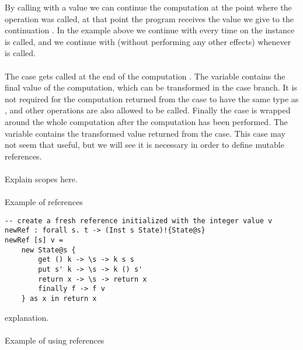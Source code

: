 By calling  with a value we can continue the computation at the point where the operation was called, at that point the program receives the value we give to the continuation .
In the example above we continue with  every time  on the instance  is called, and we continue with \ident{()} (without performing any other effects) whenever  is called.
\\\\
The  case gets called at the end of the computation .
The variable  contains the final value of the computation, which can be transformed in the case branch.
It is not required for the computation returned from the case to have the same type as , and other operations are also allowed to be called.
Finally the  case is wrapped around the whole computation  after the  computation has been performed.
The variable  contains the transformed value returned from the  case.
This case may not seem that useful, but we will see it is necessary in order to define mutable references.
\\\\
Explain scopes here.
\\\\
Example of references

\begin{verbatim}
-- create a fresh reference initialized with the integer value v
newRef : forall s. t -> (Inst s State)!{State@s}
newRef [s] v =
	new State@s {
		get () k -> \s -> k s s
		put s' k -> \s -> k () s'
		return x -> \s -> return x
		finally f -> f v
	} as x in return x
\end{verbatim}
explanation.
\\\\
Example of using references

